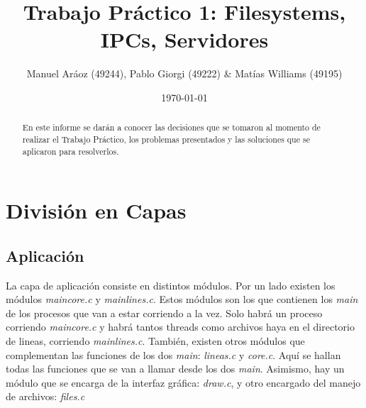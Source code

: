 \documentclass[a4paper,10pt]{elsart}
\begin{document}
\begin{frontmatter}
\title{Trabajo Pr\'actico 1: Filesystems, IPCs, Servidores}
\author{Manuel Ar\'aoz (49244), Pablo Giorgi (49222) \& Mat\'ias Williams (49195)}
\address{Ingenier\'ia en Inform\'atica\\
Instituto Tecnol\'ogico Buenos Aires\\		
Ciudad Aut\'onoma de Buenos Aires, Argentina}
\date{\today}


\maketitle

\begin{abstract}
En este informe se dar\'an a conocer las decisiones que se tomaron al momento de realizar el Trabajo Pr\'actico, los problemas presentados y las soluciones que se aplicaron para resolverlos.
\end{abstract}
\end{frontmatter}
\clearpage

\tableofcontents

\clearpage

\section{Divisi\'on en Capas}

\subsection{Aplicaci\'on}
La capa de aplicaci\'on consiste en distintos m\'odulos. Por un lado existen los m\'odulos \emph{maincore.c} y \emph{mainlines.c}. Estos m\'odulos son los que contienen los \emph{main} de los procesos que van a estar corriendo a la vez. Solo habr\'a un proceso corriendo \emph{maincore.c} y habr\'a tantos threads como archivos haya en el directorio de lineas, corriendo \emph{mainlines.c}. Tambi\'en, existen otros m\'odulos que complementan las funciones de los dos \emph{main}: \emph{lineas.c} y \emph{core.c}. Aqu\'i se hallan todas las funciones que se van a llamar desde los dos \emph{main}. Asimismo, hay un m\'odulo que se encarga de la interfaz gr\'afica: \emph{draw.c}, y otro encargado del manejo de archivos: \emph{files.c}
\end{document}
